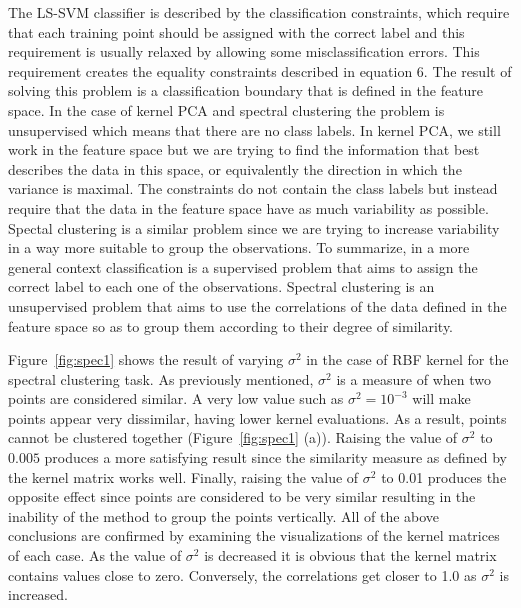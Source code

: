 \documentclass[conference,compsoc]{IEEEtran}
\begin{document}
The LS-SVM classifier is described by the classification constraints, which require that each training point should be assigned with the correct label and this requirement is usually relaxed by allowing some misclassification errors. This requirement creates the equality constraints described in equation 6. The result of solving this problem is a classification boundary that is defined in the feature space. In the case of kernel PCA and spectral clustering the problem is unsupervised which means that there are no class labels. In kernel PCA, we still work in the feature space but we are trying to find the information that best describes the data in this space, or equivalently the direction in which the variance is maximal. The constraints do not contain the class labels but instead require that the data in the feature space have as much variability as possible. Spectal clustering is a similar problem since we are trying to increase variability in a way more suitable to group the observations. 
To summarize, in a more general context classification is a supervised problem that aims to assign the correct label to each one of the observations. Spectral clustering is an unsupervised problem that aims to use the correlations of the data defined in the feature space so as to group them according to their degree of similarity.

Figure~\ref{fig:spec1} shows the result of varying $\sigma^2$ in the case of RBF kernel for the spectral clustering task. As previously mentioned, $\sigma^2$ is a measure of when two points are considered similar. A very low value such as $\sigma^2 =10^{-3}$ will make points appear very dissimilar, having lower kernel evaluations. As a result, points cannot be clustered together (Figure~\ref{fig:spec1} (a)). Raising the value of $\sigma^2$ to $0.005$ produces a more satisfying result since the similarity measure as defined by the kernel matrix works well. Finally, raising the value of $\sigma^2$ to 0.01 produces the opposite effect since points are considered to be very similar resulting in the inability of the method to group the points vertically. All of the above conclusions are confirmed by examining the visualizations of the kernel matrices of each case. As the value of $\sigma^2$ is decreased it is obvious that the kernel matrix contains values close to zero. Conversely, the correlations get closer to 1.0 as $\sigma^2$ is increased.
\end{document}

